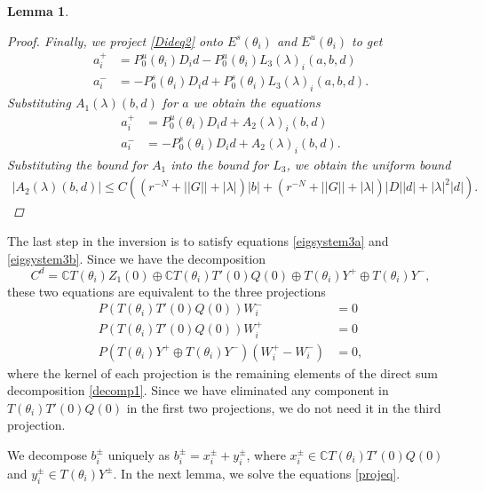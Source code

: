 \documentclass[12pt]{elsarticle}
\def\C{{\mathbb C}}
\newtheorem{lemma}{Lemma}
\begin{document}
\begin{lemma}
\begin{proof}
\noindent Finally, we project \cref{Dideq2} onto $E^s(\theta_i)$ and $E^u(\theta_i)$ to get
\begin{align*}
a_i^+ &= P_0^u(\theta_i) D_i d - P_0^u(\theta_i) L_3(\lambda)_i(a,b,d) \\
a_i^- &= -P_0^s(\theta_i) D_i d + P_0^s(\theta_i) L_3(\lambda)_i(a,b,d).
\end{align*}
Substituting $A_1(\lambda)(b,d)$ for $a$ we obtain the equations
\begin{align*}
a_i^+ &= P_0^u(\theta_i) D_i d + A_2(\lambda)_i(b,d) \\
a_i^- &= -P_0^s(\theta_i) D_i d + A_2(\lambda)_i(b,d).
\end{align*}
Substituting the bound for $A_1$ into the bound for $L_3$, we obtain the uniform bound
\begin{align*}
|A_2(\lambda)(b,d)| \leq 
C\left( (r^{-N} + ||G|| + |\lambda| )|b| + (r^{-N} + ||G|| + |\lambda|)|D||d| + |\lambda|^2 |d|  \right).
\end{align*}
\end{proof}
\end{lemma}

The last step in the inversion is to satisfy equations \cref{eigsystem3a} and \cref{eigsystem3b}. Since we have the decomposition
\begin{equation}\label{decomp1}
C^d = \C T(\theta_i) Z_1(0) \oplus \C T(\theta_i) T'(0)Q(0) \oplus T(\theta_i) Y^+ \oplus T(\theta_i) Y^-,
\end{equation}
these two equations are equivalent to the three projections
\begin{equation}\label{projeq}
\begin{aligned}
P(T(\theta_i) T'(0)Q(0)) W_i^- &= 0 \\
P(T(\theta_i) T'(0)Q(0)) W_i^+ &= 0 \\
P(T(\theta_i) Y^+ \oplus T(\theta_i) Y^-) (W_i^+ - W_i^-) &= 0,
\end{aligned}
\end{equation}
where the kernel of each projection is the remaining elements of the direct sum decomposition \cref{decomp1}. Since we have eliminated any component in $T(\theta_i) T'(0)Q(0)$ in the first two projections, we do not need it in the third projection.

We decompose $b_i^\pm$ uniquely as $b_i^\pm = x_i^\pm + y_i^\pm$, where $x_i^\pm \in \C T(\theta_i) T'(0)Q(0)$ and $y_i^\pm \in T(\theta_i) Y^\pm$. In the next lemma, we solve the equations \cref{projeq}.
\end{document}
